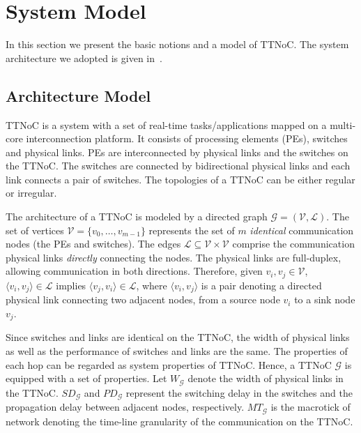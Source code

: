 \documentclass[10pt,journal]{IEEEtran}
\newcommand{\calG}{\mathcal{G}}
\newcommand{\calV}{\mathcal{V}}
\newcommand{\calL}{\mathcal{L}}
\newcommand{\width}{\mathit{W}_\calG}
\newcommand{\SD}{\mathit{SD}_\calG}
\newcommand{\HD}{\mathit{PD}_\calG}
\newcommand{\MT}{\mathit{MT}_\calG}
\theoremstyle{remark}
\begin{document}

\section{System Model}
\label{s:model}

In this section we present the basic notions and a model of TTNoC.
The system architecture we adopted is given in~\cite{DBLP:conf/rtcsa/PaukovitsK08}. 

\subsection{Architecture Model}

TTNoC is a system with a set of real-time tasks/applications mapped on a multi-core interconnection platform. 
It consists of processing elements (PEs), switches and physical links.
PEs are interconnected by physical links and the switches on the TTNoC.
The switches are connected by bidirectional physical links and each link connects a pair of switches.  
The topologies of a TTNoC can be either regular or irregular.

The architecture of a TTNoC is modeled by a directed graph $\calG=(\calV,\calL)$. 
The set of vertices $\mathcal{V}=\{ v_{0},\dots,v_{m-1}\}$ represents the set of $m$ \emph{identical} communication nodes (the PEs and switches).
The edges $\mathcal{L}\subseteq \mathcal{V} \times\mathcal{V}$ comprise the communication physical links \emph{directly} connecting the nodes.
The physical links are full-duplex, allowing communication in both directions. 
Therefore, given $v_i,v_j\in\calV$, $\langle v_i,v_j\rangle \in\calL$ implies $\langle v_j,v_i\rangle\in\calL$,
 where $\langle v_i,v_j\rangle$ is a pair denoting a directed physical link connecting two adjacent nodes,
  from a source node $v_i$ to a sink node $v_j$.

Since switches and links are identical on the TTNoC,
 the width of physical links as well as the performance of switches and links are the same.
The properties of each hop can be regarded as system properties of TTNoC.
Hence, a TTNoC $\calG$ is equipped with a set of properties. 
Let $\width$ denote the width of physical links in the TTNoC.
$\SD$ and $\HD$ represent the switching delay in the switches and the propagation delay between adjacent nodes, respectively.
$\MT$ is the macrotick of network denoting the time-line granularity of the communication on the TTNoC.
\end{document}
